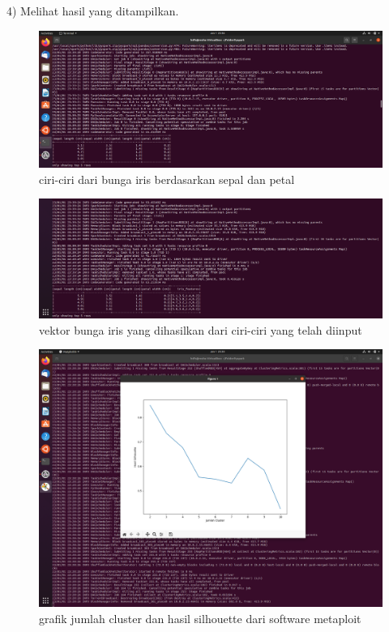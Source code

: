 \begin{enumerate}
4) Melihat hasil yang ditampilkan.
\begin{figure}[!ht]
\includegraphics[width=.9\textwidth]{TugasKelompok/Kelompok4/tabelpertama}
\caption{ciri-ciri dari bunga iris berdasarkan sepal dan petal}
\label{gam:perkuliahan-23-09}
\end{figure}
\begin{figure}[!ht]
\includegraphics[width=.9\textwidth]{TugasKelompok/Kelompok4/tabelkedua}
\caption{vektor bunga iris yang dihasilkan dari ciri-ciri yang telah diinput}
\label{gam:perkuliahan-23-09}
\end{figure}
\newpage
\begin{figure}[!ht]
\includegraphics[width=.8\textwidth]{TugasKelompok/Kelompok4/grafikpertama}
\caption{grafik jumlah cluster dan hasil silhouette dari software metaploit}
\label{gam:perkuliahan-23-09}
\end{figure}

\end{enumerate}
